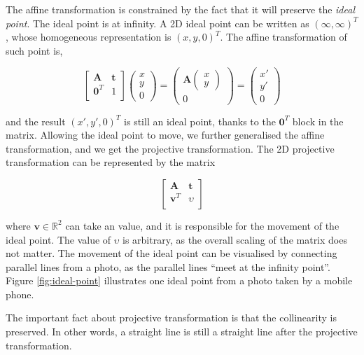 \documentclass[11pt,twoside]{report}
\begin{document}
The affine transformation is constrained by the fact that it will preserve the \emph{ideal point}. The ideal point is at infinity. A 2D ideal point can be written as $(\infty, \infty)^T$, whose homogeneous representation is $(x, y, 0)^T$. The affine transformation of such point is,

$$
\begin{bmatrix}
	\mathbf{A} & \mathbf{t}\\
	\mathbf{0}^T & 1\\
\end{bmatrix}
\begin{pmatrix}
	x \\ y \\ 0
\end{pmatrix}
=
\begin{pmatrix}
	\mathbf{A}
	\begin{pmatrix}
		x \\ y
	\end{pmatrix} \\
	0
\end{pmatrix}
= 
\begin{pmatrix}
	x\prime \\ y\prime \\ 0
\end{pmatrix}
$$

\noindent and the result $(x', y', 0)^T$ is still an ideal point, thanks to the $\mathbf{0}^T$ block in the matrix. Allowing the ideal point to move, we further generalised the affine transformation, and we get the projective transformation. The 2D projective transformation can be represented by the matrix

$$
\begin{bmatrix}
	\mathbf{A} & \mathbf{t}\\
	\mathbf{v}^T & \upsilon\\
\end{bmatrix}
$$

\noindent where $\mathbf{v} \in \mathbb{R}^2$ can take an value, and it is responsible for the movement of the ideal point. The value of $\upsilon$ is arbitrary, as the overall scaling of the matrix does not matter. The movement of the ideal point can be visualised by connecting parallel lines from a photo, as the parallel lines ``meet at the infinity point''. Figure \ref{fig:ideal-point} illustrates one ideal point from a photo taken by a mobile phone.


The important fact about projective transformation is that the collinearity is preserved. In other words, a straight line is still a straight line after the projective transformation.
\end{document}
